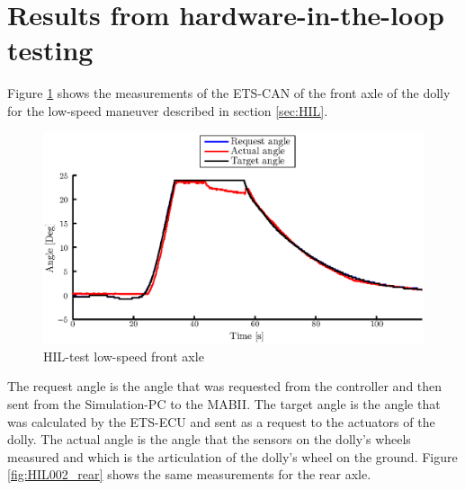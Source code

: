 \documentclass[ExampleMasters.tex]{subfiles}
\begin{document}






\section{Results from hardware-in-the-loop testing}

Figure \ref{fig:HIL002_front} shows the measurements of the ETS-CAN of the front axle of the dolly for the low-speed maneuver described in section \ref{sec:HIL}.\\

\begin{figure}[!htb]
	\centering
	\includegraphics[width=1\linewidth]{figures/HIL002_front}
	\caption{HIL-test low-speed front axle}
	
	\label{fig:HIL002_front}
\end{figure}

The request angle is the angle that was requested from the controller and then sent from the Simulation-PC to the \gls{MABII}. The target angle is the angle that was calculated by the \gls{ETS}-\gls{ECU} and sent as a request to the actuators of the dolly. The actual angle is the angle that the sensors on the dolly's wheels measured and which is the articulation of the dolly's wheel on the ground.
Figure \ref{fig:HIL002_rear} shows the same measurements for the rear axle.
\end{document}
